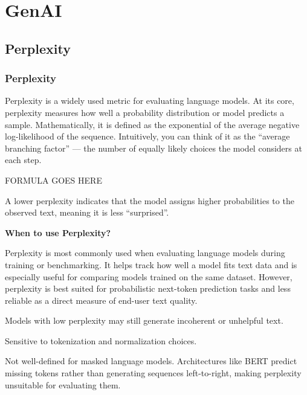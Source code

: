 \chapter{GenAI}


\clearpage
\thispagestyle{genaistyle}
\section{Perplexity}
\subsection{Perplexity}


Perplexity is a widely used metric for evaluating language models. At its core, perplexity measures how well a probability distribution or model
predicts a sample. Mathematically, it is defined as the exponential of the average negative log-likelihood of the sequence. Intuitively, you can
think of it as the “average branching factor” — the number of equally likely choices the model considers at each step.

\begin{center}
    FORMULA GOES HERE
\end{center}

A lower perplexity indicates that the model assigns higher probabilities to the observed text, meaning it is less “surprised”.

\textbf{When to use Perplexity?}

Perplexity is most commonly used when evaluating language models during training or benchmarking. It helps track how well a model fits text data and
is especially useful for comparing models trained on the same dataset. However, perplexity is best suited for probabilistic next-token prediction
tasks and less reliable as a direct measure of end-user text quality.

{
\item Models with low perplexity may still generate incoherent or unhelpful text.
\item Sensitive to tokenization and normalization choices.
\item Not well-defined for masked language models. Architectures like BERT predict missing tokens rather than generating sequences left-to-right,
making perplexity unsuitable for evaluating them.
}

